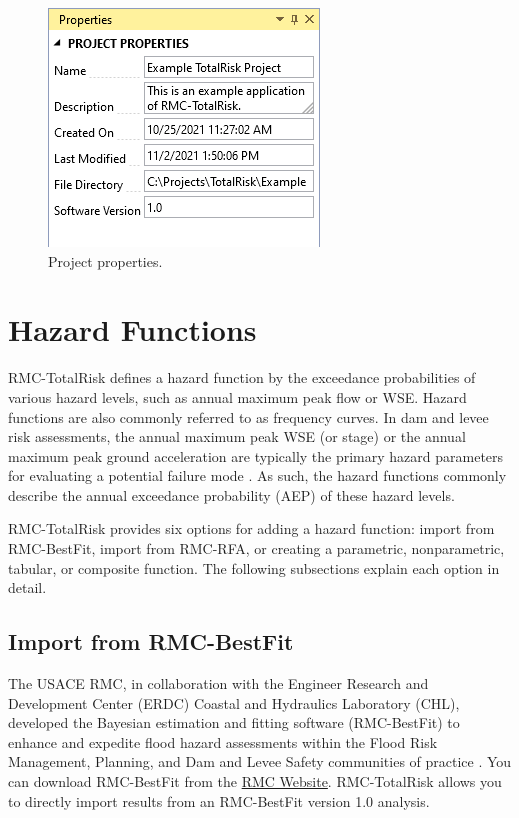 \documentclass[
]{book}
\begin{document}
\begin{figure}

{\centering \includegraphics{images/figure52} 

}

\caption{Project properties.}\label{fig:figure-52}
\end{figure}

\hypertarget{hazard-functions}{%
\chapter{Hazard Functions}\label{hazard-functions}}

RMC-TotalRisk defines a hazard function by the exceedance probabilities of various hazard levels, such as annual maximum peak flow or WSE. Hazard functions are also commonly referred to as frequency curves. In dam and levee risk assessments, the annual maximum peak WSE (or stage) or the annual maximum peak ground acceleration are typically the primary hazard parameters for evaluating a potential failure mode \citep{cite-BestPractices} \citep{cite-SmithBartlesFleming}. As such, the hazard functions commonly describe the annual exceedance probability (AEP) of these hazard levels.

RMC-TotalRisk provides six options for adding a hazard function: import from RMC-BestFit, import from RMC-RFA, or creating a parametric, nonparametric, tabular, or composite function. The following subsections explain each option in detail.

\hypertarget{bestfit}{%
\section{Import from RMC-BestFit}\label{bestfit}}

The USACE RMC, in collaboration with the Engineer Research and Development Center (ERDC) Coastal and Hydraulics Laboratory (CHL), developed the Bayesian estimation and fitting software (RMC-BestFit) to enhance and expedite flood hazard assessments within the Flood Risk Management, Planning, and Dam and Levee Safety communities of practice \citep{cite-SmithBestFitGuide}. You can download RMC-BestFit from the \href{https://www.rmc.usace.army.mil/Software/RMC-BestFit/}{RMC Website}. RMC-TotalRisk allows you to directly import results from an RMC-BestFit version 1.0 analysis.
\end{document}
